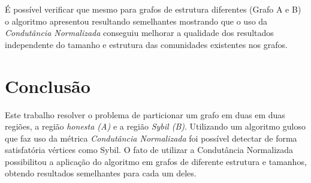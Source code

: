\documentclass[12pt]{article}
\begin{document}
É possível verificar que mesmo para grafos de estrutura diferentes (Grafo A e B) o algoritmo apresentou resultando semelhantes mostrando que o uso da \textit{Condutância Normalizada} conseguiu melhorar a qualidade dos resultados independente do tamanho e estrutura das comunidades existentes nos grafos.

\begin{table}[h]
\centering
{}
\caption{Métricas Grafos A e B - Parte 02/02}
\label{tab:metricas_parte_02}
\end{table}


\section{Conclusão}
\label{sec:conclusao}

Este trabalho resolver o problema de particionar um grafo em duas em duas regiões, a região \emph{honesta (A)} e a região \emph{Sybil (B)}. Utilizando um algoritmo guloso que faz uso da métrica \textit{Condutância Normalizada} foi possível detectar de forma satisfatória vértices como Sybil. O fato de utilizar a Condutância Normalizada possibilitou a aplicação do algoritmo em grafos de diferente estrutura e tamanhos, obtendo resultados semelhantes para cada um deles.



\end{document}

